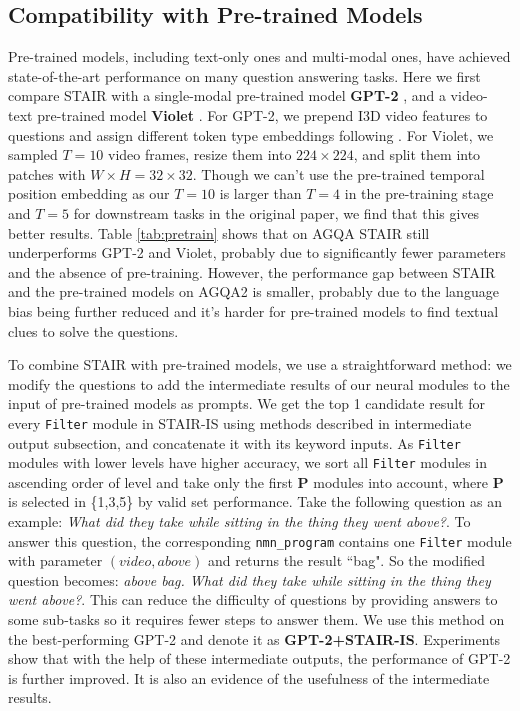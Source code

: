 \documentclass[letterpaper]{article} %
\begin{document}
\subsection{Compatibility with Pre-trained Models}
Pre-trained models, including text-only ones and multi-modal ones, have achieved state-of-the-art performance on many question answering tasks. Here we first compare STAIR with a single-modal pre-trained model \textbf{GPT-2} \cite{Radford2019LanguageMA}, and a video-text pre-trained model \textbf{Violet} \cite{Fu2021VIOLETE}.
For GPT-2, we prepend I3D video features to questions and assign different token type embeddings following \cite{Li2020BridgingTA}.
For Violet, we sampled $T=10$ video frames, resize them into $224 \times 224$, and split them into patches with $W \times H = 32 \times 32$. Though we can't use the pre-trained temporal position embedding as our $T=10$ is larger than $T=4$ in the pre-training stage and $T=5$ for downstream tasks in the original paper, we find that this gives better results. Table \ref{tab:pretrain} shows that on AGQA STAIR still underperforms GPT-2 and Violet, probably due to significantly fewer parameters and the absence of pre-training.
However, the performance gap between STAIR and the pre-trained models on AGQA2 is smaller, probably due to the language bias being further reduced and it's harder for pre-trained models to find textual clues to solve the questions. 

To combine STAIR with pre-trained models, we use a straightforward method: we modify the questions to add the intermediate results of our neural modules to the input of pre-trained models as prompts. We get the top 1 candidate result for every \texttt{Filter} module in STAIR-IS using methods described in intermediate output subsection, and concatenate it with its keyword inputs. As \texttt{Filter} modules with lower levels have higher accuracy, we sort all \texttt{Filter} modules in ascending order of level and take only the first $\mathbf{P}$ modules into account, where $\mathbf{P}$ is selected in \{1,3,5\} by valid set performance. Take the following question as an example: \textit{What did they take while sitting in the thing they went above?}. To answer this question, the corresponding \texttt{nmn\_program} contains one \texttt{Filter} module with parameter $(video, above)$ and returns the result ``bag". So the modified question becomes: \textit{above bag. What did they take while sitting in the thing they went above?}. This can reduce the difficulty of questions by providing answers to some sub-tasks so it requires fewer steps to answer them.
We use this method on the best-performing GPT-2 and denote it as \textbf{GPT-2+STAIR-IS}. Experiments show that with the help of these intermediate outputs, the performance of GPT-2 is further improved. It is also an evidence of the usefulness of the intermediate results.
\end{document}
